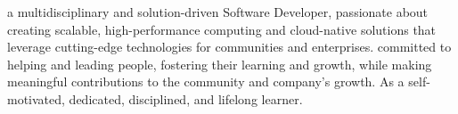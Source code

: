 a multidisciplinary and solution-driven Software Developer, passionate about creating scalable, high-performance computing and cloud-native solutions that leverage cutting-edge technologies for communities and enterprises. committed to helping and leading people, fostering their learning and growth, while making meaningful contributions to the community and company’s growth. As a self-motivated, dedicated, disciplined, and lifelong learner. 
